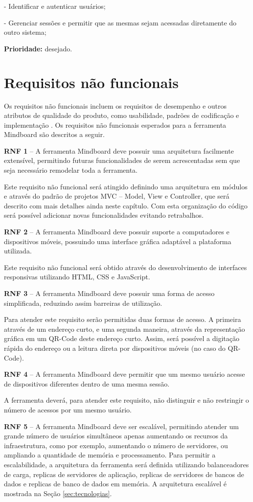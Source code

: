 - Identificar e autenticar usuários;

- Gerenciar sessões e permitir que as mesmas sejam acessadas diretamente do outro sistema;

\textbf{Prioridade:} desejado.

\section{Requisitos não funcionais}

Os requisitos não funcionais incluem os requisitos de desempenho e outros atributos de qualidade do produto, como usabilidade, padrões de codificação e implementação \cite{padua05}. Os requisitos não funcionais esperados para a ferramenta Mindboard são descritos a seguir.

\textbf{RNF 1} – A ferramenta Mindboard deve possuir uma arquitetura facilmente extensível, permitindo futuras funcionalidades de serem acrescentadas sem que seja necessário remodelar toda a ferramenta.

Este requisito não funcional será atingido definindo uma arquitetura em módulos e através do padrão de projetos MVC – Model, View e Controller, que será descrito com mais detalhes ainda neste capítulo. Com esta organização do código será possível adicionar novas funcionalidades evitando retrabalhos.


\textbf{RNF 2} – A ferramenta Mindboard deve possuir suporte a computadores e dispositivos móveis, possuindo uma interface gráfica adaptável a plataforma utilizada.

Este requisito não funcional será obtido através do desenvolvimento de interfaces responsivas utilizando HTML, CSS e JavaScript.

\textbf{RNF 3} – A ferramenta Mindboard deve possuir uma forma de acesso simplificada, reduzindo assim barreiras de utilização. 

Para atender este requisito serão permitidas duas formas de acesso. A primeira através de um endereço curto, e uma segunda maneira, através da representação gráfica em um QR-Code deste endereço curto. Assim, será possível a digitação rápida do endereço ou a leitura direta por dispositivos móveis (no caso do QR-Code).

\textbf{RNF 4} – A ferramenta Mindboard deve permitir que um mesmo usuário acesse de dispositivos diferentes dentro de uma mesma sessão. 

A ferramenta deverá, para atender este requisito, não distinguir e não restringir o número de acessos por um mesmo usuário.

\textbf{RNF 5} – A ferramenta Mindboard deve ser escalável, permitindo atender um grande número de usuários simultâneos apenas aumentando os recursos da infraestrutura, como por exemplo, aumentando o número de servidores, ou ampliando a quantidade de memória e processamento.  Para permitir a escalabilidade, a arquitetura da ferramenta será definida utilizando balanceadores de carga, replicas de servidores de aplicação, replicas de servidores de bancos de dados e replicas de banco de dados em memória. A arquitetura escalável é mostrada na Seção \ref{sec:tecnologias}.